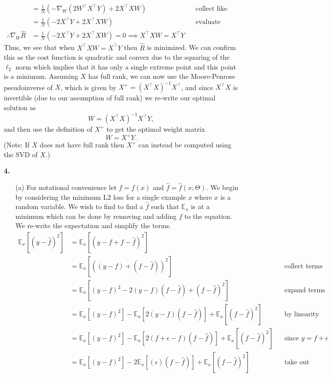 \documentclass [10pt]{article}
\begin{document}
\begin{enumerate}
\begin{align}
		&=\frac{1}{N}(-\nabla_{W}(2W^{\top}X^{\top}Y)+2X^{\top}XW)&&\text{collect like terms}\nonumber\\
		&=\frac{1}{N}(-2X^{\top}Y+2X^{\top}XW)&&\text{evaluate gradient}\nonumber\\
		\therefore\nabla_{W}\hat{R}&=\frac{1}{N}(-2X^{\top}Y+2X^{\top}XW)=0\implies X^{\top}XW=X^{\top}Y\nonumber
	\end{align}
	Thus, we see that when $X^{\top}XW=X^{\top}Y$ then $\hat{R}$ is minimized. We can confirm this as the cost function is quadratic and convex due to the squaring of the $\ell_{2}$ norm which implies that it has only a single extreme point and this point is a minimum. Assuming $X$ has full rank, we can now use the Moore-Penrose pseudoinverse of $X$, which is given by $X^{+}=(X^{\top}X)^{-1}X^{\top}$, and since $X^{\top}X$ is invertible (due to our assumption of full rank) we re-write our optimal solution as$$W=(X^{\top}X)^{-1}X^{\top}Y,$$and then use the definition of $X^{+}$ to get the optimal weight matrix$$W=X^{+}Y.$$ (Note: If $X$ does not have full rank then $X^{+}$ can instead be computed using the SVD of $X$.)
	\newpage
	\item[\textbf{4.$\>$}]
	\begin{enumerate}
		\item[(a)]For notational convenience let $f=f(x)$ and $\hat{f}=\hat{f}(x;\Theta)$. We begin by considering the minimum L$2$ loss for a single example $x$ where $x$ is a random variable. We wish to find to find a $\hat{f}$ such that $\mathbb{E}_{x}$ is at a minimum which can be done by removing and adding $f$ to the equation. We re-write the expectation and simplify the terms.
		\begin{align}
			\mathbb{E}_{x}[(y-\hat{f})^{2}]&=\mathbb{E}_{x}[(y-f+f-\hat{f})^{2}]\nonumber\\
			&=\mathbb{E}_{x}[((y-f)+(f-\hat{f}))^{2}]&&\text{collect terms}\nonumber\\
			&=\mathbb{E}_{x}[(y-f)^{2}-2(y-f)(f-\hat{f})+(f-\hat{f})^{2}]&&\text{expand terms}\nonumber\\
			&=\mathbb{E}_{x}[(y-f)^{2}]-\mathbb{E}_{x}[2(y-f)(f-\hat{f})]+\mathbb{E}_{x}[(f-\hat{f})^{2}]&&\text{by linearity}\nonumber\\
			&=\mathbb{E}_{x}[(y-f)^{2}]-\mathbb{E}_{x}[2(f+\epsilon-f)(f-\hat{f})]+\mathbb{E}_{x}[(f-\hat{f})^{2}]&&\text{since $y = f + \epsilon$}\nonumber\\
			&=\mathbb{E}_{x}[(y-f)^{2}]-2\mathbb{E}_{x}[(\epsilon)(f-\hat{f})]+\mathbb{E}_{x}[(f-\hat{f})^{2}]&&\text{take out constant}\nonumber\\

\end{align}
\end{enumerate}
\end{enumerate}
\end{document}
